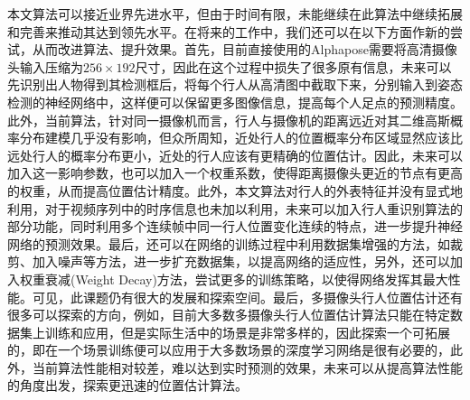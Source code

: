 本文算法可以接近业界先进水平，但由于时间有限，未能继续在此算法中继续拓展和完善来推动其达到领先水平。在将来的工作中，我们还可以在以下方面作新的尝试，从而改进算法、提升效果。首先，目前直接使用的Alphapose需要将高清摄像头输入压缩为$256\times 192$尺寸，因此在这个过程中损失了很多原有信息，未来可以先识别出人物得到其检测框后，将每个行人从高清图中截取下来，分别输入到姿态检测的神经网络中，这样便可以保留更多图像信息，提高每个人足点的预测精度。此外，当前算法，针对同一摄像机而言，行人与摄像机的距离远近对其二维高斯概率分布建模几乎没有影响，但众所周知，近处行人的位置概率分布区域显然应该比远处行人的概率分布更小，近处的行人应该有更精确的位置估计。因此，未来可以加入这一影响参数，也可以加入一个权重系数，使得距离摄像头更近的节点有更高的权重，从而提高位置估计精度。此外，本文算法对行人的外表特征并没有显式地利用，对于视频序列中的时序信息也未加以利用，未来可以加入行人重识别算法的部分功能，同时利用多个连续帧中同一行人位置变化连续的特点，进一步提升神经网络的预测效果。最后，还可以在网络的训练过程中利用数据集增强的方法，如裁剪、加入噪声等方法，进一步扩充数据集，以提高网络的适应性，另外，还可以加入权重衰减(Weight Decay)方法，尝试更多的训练策略，以使得网络发挥其最大性能。可见，此课题仍有很大的发展和探索空间。最后，多摄像头行人位置估计还有很多可以探索的方向，例如，目前大多数多摄像头行人位置估计算法只能在特定数据集上训练和应用，但是实际生活中的场景是非常多样的，因此探索一个可拓展的，即在一个场景训练便可以应用于大多数场景的深度学习网络是很有必要的，此外，当前算法性能相对较差，难以达到实时预测的效果，未来可以从提高算法性能的角度出发，探索更迅速的位置估计算法。